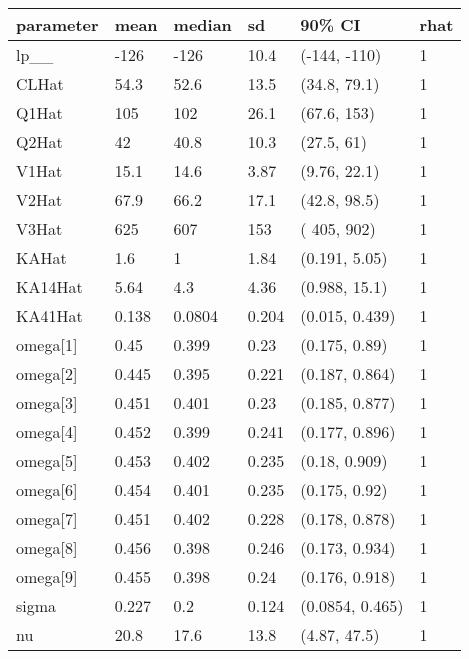 
\begin{tabular}{l|l|l|l|l|l}
\hline
parameter & mean & median & sd & 90\% CI & rhat\\
\hline
lp\_\_ & -126 & -126 & 10.4 & (-144, -110) & 1\\
\hline
CLHat & 54.3 & 52.6 & 13.5 & (34.8, 79.1) & 1\\
\hline
Q1Hat & 105 & 102 & 26.1 & (67.6,  153) & 1\\
\hline
Q2Hat & 42 & 40.8 & 10.3 & (27.5,   61) & 1\\
\hline
V1Hat & 15.1 & 14.6 & 3.87 & (9.76, 22.1) & 1\\
\hline
V2Hat & 67.9 & 66.2 & 17.1 & (42.8, 98.5) & 1\\
\hline
V3Hat & 625 & 607 & 153 & ( 405,  902) & 1\\
\hline
KAHat & 1.6 & 1 & 1.84 & (0.191, 5.05) & 1\\
\hline
KA14Hat & 5.64 & 4.3 & 4.36 & (0.988, 15.1) & 1\\
\hline
KA41Hat & 0.138 & 0.0804 & 0.204 & (0.015, 0.439) & 1\\
\hline
omega[1] & 0.45 & 0.399 & 0.23 & (0.175, 0.89) & 1\\
\hline
omega[2] & 0.445 & 0.395 & 0.221 & (0.187, 0.864) & 1\\
\hline
omega[3] & 0.451 & 0.401 & 0.23 & (0.185, 0.877) & 1\\
\hline
omega[4] & 0.452 & 0.399 & 0.241 & (0.177, 0.896) & 1\\
\hline
omega[5] & 0.453 & 0.402 & 0.235 & (0.18, 0.909) & 1\\
\hline
omega[6] & 0.454 & 0.401 & 0.235 & (0.175, 0.92) & 1\\
\hline
omega[7] & 0.451 & 0.402 & 0.228 & (0.178, 0.878) & 1\\
\hline
omega[8] & 0.456 & 0.398 & 0.246 & (0.173, 0.934) & 1\\
\hline
omega[9] & 0.455 & 0.398 & 0.24 & (0.176, 0.918) & 1\\
\hline
sigma & 0.227 & 0.2 & 0.124 & (0.0854, 0.465) & 1\\
\hline
nu & 20.8 & 17.6 & 13.8 & (4.87, 47.5) & 1\\
\hline
\end{tabular}
